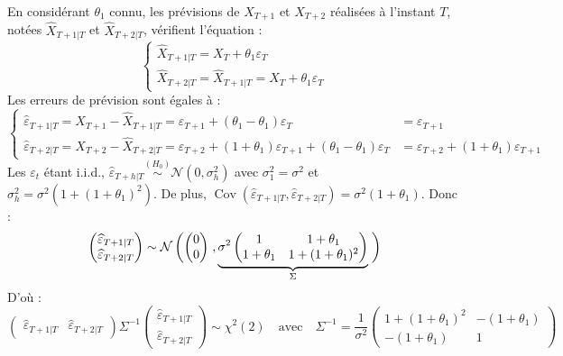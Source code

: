\documentclass[,french]{article}
\DeclareMathOperator{\Cov}{Cov}
\begin{document}
En considérant \(\theta_1\) connu, les prévisions de \(X_{T+1}\) et \(X_{T+2}\) réalisées à l'instant \(T\), notées \(\widehat X_{T+1\vert T}\) et \(\widehat X_{T+2\vert T}\), vérifient l'équation :
\[
\begin{cases}
\widehat X_{T+1\vert T}= X_T + \theta_1\varepsilon_T \\
\widehat X_{T+2\vert T}=\widehat X_{T+1\vert T} =  X_T + \theta_1\varepsilon_T 
\end{cases}
\]
Les erreurs de prévision sont égales à :
\[
\begin{cases}
\widehat \varepsilon_{T+1\vert T} = X_{T+1} - \widehat X_{T+1\vert T}=
\varepsilon_{T+1}+(\theta_1-\theta_1)\varepsilon_T 
&= \varepsilon_{T+1}
\\
\widehat \varepsilon_{T+2\vert T} = X_{T+2} - \widehat X_{T+2\vert T}=
\varepsilon_{T+2}+(1+\theta_1)\varepsilon_{T+1}+(\theta_1-\theta_1)\varepsilon_T 
&=
\varepsilon_{T+2}+(1+\theta_1)\varepsilon_{T+1}
\end{cases}
\]
Les \(\varepsilon_t\) étant i.i.d., \(\widehat \varepsilon_{T+h\vert T} \overset{(H_0)}{\sim}\mathcal N(0,\sigma_h^2)\) avec \(\sigma_1^2=\sigma^2\) et \(\sigma_h^2=\sigma^2(1+(1+\theta_1)^2)\).
De plus, \(\Cov(\widehat \varepsilon_{T+1\vert T},\widehat \varepsilon_{T+2\vert T})=\sigma^2(1+\theta_1)\). Donc :
\[
\begin{pmatrix}
    \widehat \varepsilon_{T+1\vert T} \\ \widehat \varepsilon_{T+2\vert T}
\end{pmatrix} \sim
\mathcal N \left(
\begin{pmatrix}
    0 \\ 0
\end{pmatrix}\right.,
\underbrace{
\sigma^2 
\begin{pmatrix}
    1 & 1+\theta_1\\ 1+\theta_1 & 1+ (1+\theta_1)^2
\end{pmatrix}}_{\Sigma}\left.\mathclap{\phantom{\begin{pmatrix} 0\\0 \end{pmatrix}}}
\right)
\]
D'où :
\[
\begin{pmatrix}
    \widehat \varepsilon_{T+1\vert T} & \widehat \varepsilon_{T+2\vert T}
\end{pmatrix}
\Sigma^{-1}
\begin{pmatrix}
    \widehat \varepsilon_{T+1\vert T} \\ \widehat \varepsilon_{T+2\vert T}
\end{pmatrix}\sim{\chi}^2(2) 
\quad\text{avec}\quad
\Sigma^{-1} = 
\frac{1}{\sigma^2}
\begin{pmatrix}
     1+(1+\theta_1)^2 & - (1+\theta_1) \\ -(1+\theta_1) &1
\end{pmatrix}
\]
\end{document}
